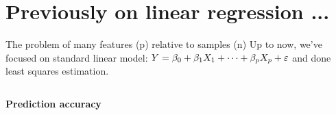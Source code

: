 \documentclass[aspectratio=169,usenames,dvipsnames]{beamer}
\newcommand{\InstructorNotes}[1]{\textit{\color{orange}#1}}
\newcommand{\InstructorList}[1]{
\begin{itemize}
	\color{orange}
	#1
\end{itemize}
}
\renewcommand{\InstructorNotes}[1]{}
\renewcommand{\InstructorList}[1]{}
\begin{document}
\section{Previously on linear regression ...}

\begin{frame}[t]{The problem of many features (p) relative to samples (n)}
	Up to now, we've focused on standard linear model:
		$Y = \beta_0 + \beta_1 X_1 + \cdots + \beta_p X_p + \varepsilon$
	and done least squares estimation.
	\InstructorNotes{Translation: Minimize $RSS = \sum_{i}(y_i-\hat y_i)^2$}
\begin{columns}
\centering
\textbf{Prediction accuracy}
\footnotesize
\InstructorList{
\item If the true relationship is approximately linear, least squares estimates have low bias
\item If $n \gg p$, then least squares also has low variance
\item If $n$ not much larger than $p$, then high variability, overfitting, poor predictions
\item If $n<p$ then no unique solution so can't use at all
\item Goal on next slide: shrink/constrain number of variables to improve accuracy
}
\centering
\end{columns}

\end{frame}
\end{document}
